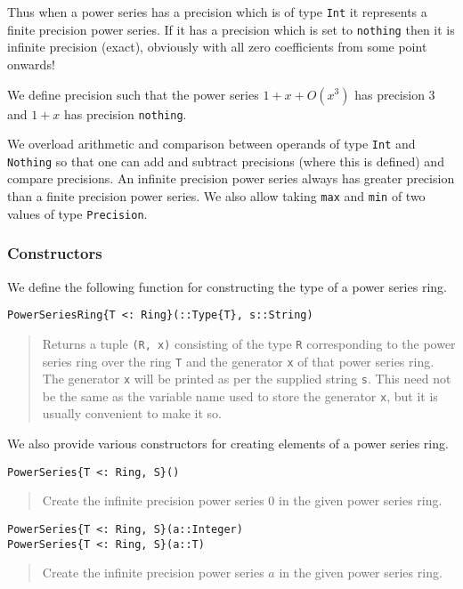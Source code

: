 \documentclass[a4paper,10pt]{article}
\newcommand{\code}{\lstinline}
\newcommand{\desc}[1]{\vspace{-3mm}\begin{quote}#1\end{quote}}
\begin{document}
{{Thus when a power series has a precision which is of type \code{Int} it
represents a finite precision power series. If it has a precision which is
set to \code{nothing} then it is infinite precision (exact), obviously
with all zero coefficients from some point onwards!

We define precision such that the power series $1 + x + O(x^3)$ has
precision $3$ and $1 + x$ has precision \code{nothing}.

We overload arithmetic and comparison between operands of type \code{Int}
and \code{Nothing} so that one can add and subtract precisions (where this
is defined) and compare precisions. An infinite precision power series
always has greater precision than a finite precision power series. We also
allow taking \code{max} and \code{min} of two values of type \code{Precision}.

\subsubsection{Constructors}

We define the following function for constructing the type of a power series
ring.

\begin{lstlisting}
PowerSeriesRing{T <: Ring}(::Type{T}, s::String)
\end{lstlisting}

\desc{Returns a tuple \code{(R, x)} consisting of the type \code{R} 
corresponding to the power series ring over the ring \code{T} and the generator
\code{x} of that power series ring. The generator \code{x} will be printed as
per the supplied string \code{s}. This need not be the same as the variable
name used to store the generator \code{x}, but it is usually convenient to make
it so.}

We also provide various constructors for creating elements of a power series
ring.

\begin{lstlisting}
PowerSeries{T <: Ring, S}()
\end{lstlisting}

\desc{Create the infinite precision power series $0$ in the given power series
ring.}

\begin{lstlisting}
PowerSeries{T <: Ring, S}(a::Integer)
PowerSeries{T <: Ring, S}(a::T)
\end{lstlisting}

\desc{Create the infinite precision power series $a$ in the given power series
ring.}

}}
\end{document}
